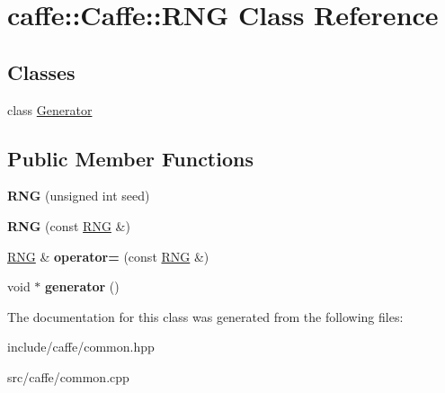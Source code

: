 \hypertarget{classcaffe_1_1Caffe_1_1RNG}{}\section{caffe\+:\+:Caffe\+:\+:R\+NG Class Reference}
\label{classcaffe_1_1Caffe_1_1RNG}
\subsection*{Classes}
\begin{DoxyCompactItemize}
\item 
class \hyperlink{classcaffe_1_1Caffe_1_1RNG_1_1Generator}{Generator}
\end{DoxyCompactItemize}
\subsection*{Public Member Functions}
\begin{DoxyCompactItemize}
\item 
{\bfseries R\+NG} (unsigned int seed)\hypertarget{classcaffe_1_1Caffe_1_1RNG_a0b676deb529cd8b60b58c527c53a2130}{}\label{classcaffe_1_1Caffe_1_1RNG_a0b676deb529cd8b60b58c527c53a2130}

\item 
{\bfseries R\+NG} (const \hyperlink{classcaffe_1_1Caffe_1_1RNG}{R\+NG} \&)\hypertarget{classcaffe_1_1Caffe_1_1RNG_a1c16756c9b842bf803d1203e6d397b98}{}\label{classcaffe_1_1Caffe_1_1RNG_a1c16756c9b842bf803d1203e6d397b98}

\item 
\hyperlink{classcaffe_1_1Caffe_1_1RNG}{R\+NG} \& {\bfseries operator=} (const \hyperlink{classcaffe_1_1Caffe_1_1RNG}{R\+NG} \&)\hypertarget{classcaffe_1_1Caffe_1_1RNG_a8369fd231a12f34d39c85cbcce69b847}{}\label{classcaffe_1_1Caffe_1_1RNG_a8369fd231a12f34d39c85cbcce69b847}

\item 
void $\ast$ {\bfseries generator} ()\hypertarget{classcaffe_1_1Caffe_1_1RNG_a4cbd9a29a1fe7220d16e8751cbb55560}{}\label{classcaffe_1_1Caffe_1_1RNG_a4cbd9a29a1fe7220d16e8751cbb55560}

\end{DoxyCompactItemize}


The documentation for this class was generated from the following files\+:\begin{DoxyCompactItemize}
\item 
include/caffe/common.\+hpp\item 
src/caffe/common.\+cpp\end{DoxyCompactItemize}
